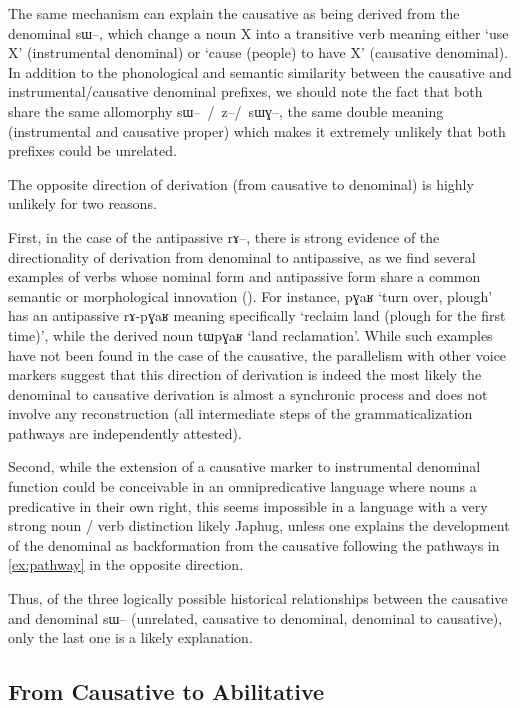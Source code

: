 \documentclass[oldfontcommands,oneside,a4paper,11pt]{article}
\newcommand{\ipa}[1]{{\phon \mbox{#1}}} %
\begin{document}
The same mechanism can explain the causative as being derived from the denominal \ipa{sɯ--}, which change a noun X into a transitive verb meaning either `use X' (instrumental denominal) or `cause (people) to have X' (causative denominal). In addition to the phonological and semantic similarity between the causative and instrumental/causative denominal prefixes, we should note the fact that both share the same allomorphy \ipa{sɯ-- / z--/ sɯɣ--}, the  same double meaning (instrumental and causative proper) which makes it extremely unlikely that both prefixes could be unrelated.

The opposite direction of derivation (from causative to denominal)  is highly unlikely for two reasons. 

First, in the case of the antipassive \ipa{rɤ--}, there is strong evidence of the directionality of derivation from denominal to antipassive, as we find several examples of verbs whose nominal form and antipassive form share a common semantic or morphological innovation  (\citealt{jacques14antipassive}). For instance, \ipa{pɣaʁ} `turn over, plough' has an antipassive \ipa{rɤ-pɣaʁ} meaning specifically `reclaim land (plough for the first time)', while the derived noun \ipa{tɯpɣaʁ}   `land reclamation'. While such examples have not been found in the case of the causative, the parallelism with other voice markers suggest that this direction of derivation is indeed the most likely the denominal to causative derivation is almost a synchronic process and does not involve any reconstruction (all intermediate steps of the grammaticalization pathways are independently attested). 

Second, while the   extension of a  causative marker to  instrumental denominal function could be conceivable in an omnipredicative language where nouns  a predicative in their own right, this seems impossible in a language with a very strong noun / verb distinction likely Japhug, unless one explains the development of the denominal as  backformation from the causative following the pathways in \ref{ex:pathway} in the opposite direction.

Thus, of the three logically possible historical relationships between the causative and denominal \ipa{sɯ--} (unrelated, causative to denominal, denominal to causative), only the last one is a likely explanation.


\subsection{From Causative to Abilitative}
\end{document}

